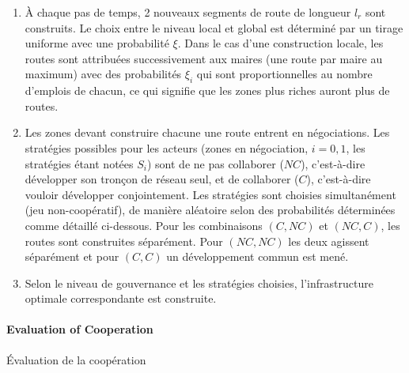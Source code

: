 {\begin{enumerate}
	\item À chaque pas de temps, 2 nouveaux segments de route de longueur $l_r$ sont construits. Le choix entre le niveau local et global est déterminé par un tirage uniforme avec une probabilité $\xi$. Dans le cas d'une construction locale, les routes sont attribuées successivement aux maires (une route par maire au maximum) avec des probabilités $\xi_i$ qui sont proportionnelles au nombre d'emplois de chacun, ce qui signifie que les zones plus riches auront plus de routes.
	\item Les zones devant construire chacune une route entrent en négociations. Les stratégies possibles pour les acteurs (zones en négociation, $i=0,1$, les stratégies étant notées $S_i$) sont de ne pas collaborer ($NC$), c'est-à-dire développer son tronçon de réseau seul, et de collaborer ($C$), c'est-à-dire vouloir développer conjointement. Les stratégies sont choisies simultanément (jeu non-coopératif), de manière aléatoire selon des probabilités déterminées comme détaillé ci-dessous. Pour les combinaisons $(C,NC)$ et $(NC,C)$, les routes sont construites séparément. Pour $(NC,NC)$ les deux agissent séparément et pour $(C,C)$ un développement commun est mené.
	\item Selon le niveau de gouvernance et les stratégies choisies, l'infrastructure optimale correspondante est construite.
\end{enumerate}
}


\paragraph{Evaluation of Cooperation}{Évaluation de la coopération}

